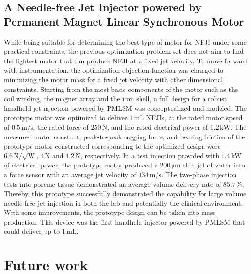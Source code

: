     
    \subsection{A Needle-free Jet Injector powered by Permanent Magnet Linear Synchronous Motor}
    
        
        While being suitable for determining the best type of motor for NFJI under some practical constraints, the previous optimization problem set does not aim to find the lightest motor that can produce \acs{NFJI} at a fixed jet velocity. To move forward with instrumentation, the optimization objection function was changed to minimizing the motor mass for a fixed jet velocity with other dimensional constraints. Starting from the most basic components of the motor such as the coil winding, the magnet array and the iron shell, a full design for a robust handheld jet injection powered by \acs{PMLSM} was conceptualized and modeled. The prototype motor was optimized to deliver $1\,\mathrm{mL}$ NFJIs, at the rated motor speed of $0.5\,\mathrm{m/s}$, the rated force of $250\,\mathrm{N}$, and the rated electrical power of $1.2\,\mathrm{kW}$. The measured motor constant, peak-to-peak cogging force, and bearing friction of the prototype motor constructed corresponding to the optimized design were $6.6\,\mathrm{N/\sqrt{W}}$, $4\,\mathrm{N}$ and $4.2\,\mathrm{N}$, respectively. In a test injection provided with $1.4\,\mathrm{kW}$ of electrical power, the prototype motor produced a $200\,\mathrm{\mu m}$ thin jet of water into a force sensor with an average jet velocity of $134\,\mathrm{m/s}$. The two-phase injection tests into porcine tissue demonstrated an average volume delivery rate of $85.7\,\%$. Thereby, this prototype successfully demonstrated the capability for large volume needle-free jet injection in both the lab and potentially the clinical environment. With some improvements, the prototype design can be taken into mass production. This device was the first handheld injector powered by \acs{PMLSM} that could deliver up to $1\,\mathrm{mL}$. 
        
        
\section{Future work}                  


